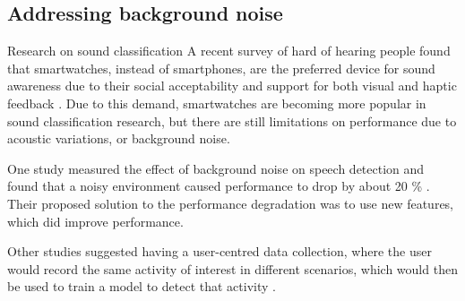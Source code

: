 \documentclass[conference]{IEEEtran}
\begin{document}
	\subsection{Addressing background noise}
	Research on sound classification 
	A recent survey of hard of hearing people found that smartwatches, instead of smartphones, are the preferred device for sound awareness due to their social acceptability and support for both visual and haptic feedback \cite{2020_SoundWatch}.
	Due to this demand, smartwatches are becoming more popular in sound classification research, but there are still limitations on performance due to acoustic variations, or background noise.
	
	One study measured the effect of background noise on speech detection and found that a noisy environment caused performance to drop by about 20 \% \cite{2002_Content_Analysis}.
	Their proposed solution to the performance degradation was to use new features, which did improve performance.
	
	Other studies suggested having a user-centred data collection, where the user would record the same activity of interest in different scenarios, which would then be used to train a model to detect that activity \cite{2016_Personalizable} \cite{2020_SoundWatch}.
	
\end{document}
